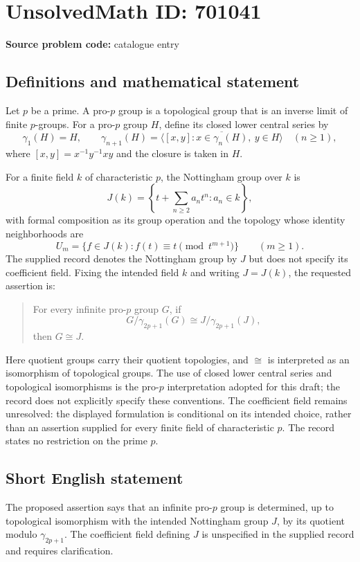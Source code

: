 \documentclass[11pt]{article}
\begin{document}
\section*{UnsolvedMath ID: 701041}
\textbf{Source problem code:} catalogue entry
\subsection{Definitions and mathematical statement}
Let \(p\) be a prime. A pro-\(p\) group is a topological group that is an inverse limit of finite \(p\)-groups. For a pro-\(p\) group \(H\), define its closed lower central series by
\[
\gamma_1(H)=H,\qquad
\gamma_{n+1}(H)=\overline{\langle [x,y]:x\in\gamma_n(H),\ y\in H\rangle}\quad(n\geq 1),
\]
where \([x,y]=x^{-1}y^{-1}xy\) and the closure is taken in \(H\).

For a finite field \(k\) of characteristic \(p\), the Nottingham group over \(k\) is
\[
J(k)=\left\{t+\sum_{n\geq 2}a_nt^n:a_n\in k\right\},
\]
with formal composition as its group operation and the topology whose identity neighborhoods are
\[
U_m=\{f\in J(k):f(t)\equiv t\pmod{t^{m+1}}\}\qquad(m\geq 1).
\]
The supplied record denotes the Nottingham group by \(J\) but does not specify its coefficient field. Fixing the intended field \(k\) and writing \(J=J(k)\), the requested assertion is:
\begin{quote}
For every infinite pro-\(p\) group \(G\), if
\[
G/\gamma_{2p+1}(G)\cong J/\gamma_{2p+1}(J),
\]
then \(G\cong J\).
\end{quote}
Here quotient groups carry their quotient topologies, and \(\cong\) is interpreted as an isomorphism of topological groups. The use of closed lower central series and topological isomorphisms is the pro-\(p\) interpretation adopted for this draft; the record does not explicitly specify these conventions. The coefficient field remains unresolved: the displayed formulation is conditional on its intended choice, rather than an assertion supplied for every finite field of characteristic \(p\). The record states no restriction on the prime \(p\).
\subsection{Short English statement}
The proposed assertion says that an infinite pro-\(p\) group is determined, up to topological isomorphism with the intended Nottingham group \(J\), by its quotient modulo \(\gamma_{2p+1}\). The coefficient field defining \(J\) is unspecified in the supplied record and requires clarification.
\end{document}
